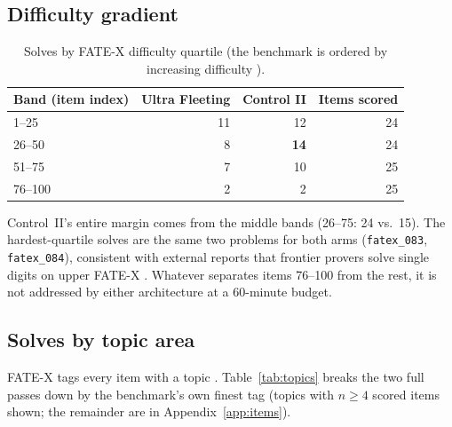 \documentclass[12pt, a4paper]{article}
\newcommand{\run}[1]{\texttt{#1}}
\begin{document}
\subsection{Difficulty gradient}
\label{sec:difficulty}

\begin{table}[H]
\centering\small
\caption{Solves by FATE-X difficulty quartile (the benchmark is ordered by
increasing difficulty \cite{fatex2025}).}
\label{tab:bands}
\begin{tabular}{@{}lrrr@{}}
\toprule
Band (item index) & Ultra Fleeting & Control II & Items scored \\
\midrule
1--25   & 11 & 12 & 24 \\
26--50  & 8  & \textbf{14} & 24 \\
51--75  & 7  & 10 & 25 \\
76--100 & 2  & 2  & 25 \\
\bottomrule
\end{tabular}
\end{table}

Control~II's entire margin comes from the middle bands (26--75: 24 vs.\ 15).
The hardest-quartile solves are the same two problems for both arms
(\run{fatex\_083}, \run{fatex\_084}), consistent with external reports that
frontier provers solve single digits on upper FATE-X
\cite{benchmarklist_fatex}. Whatever separates items 76--100 from the rest, it
is not addressed by either architecture at a 60-minute budget.

\subsection{Solves by topic area}
\label{sec:topics}

FATE-X tags every item with a topic \cite{fatex2025}. Table~\ref{tab:topics}
breaks the two full passes down by the benchmark's own finest tag (topics with
$n\ge4$ scored items shown; the remainder are in
Appendix~\ref{app:items}).
\end{document}
